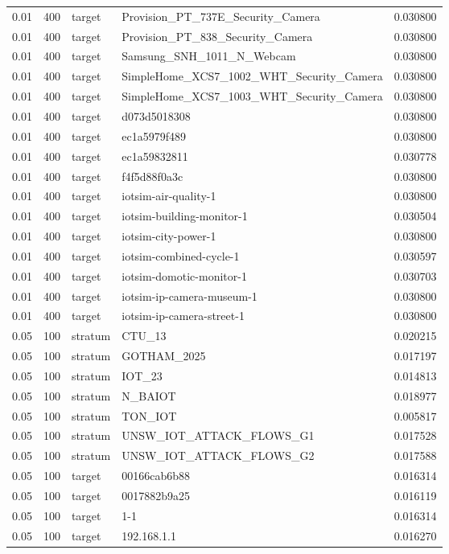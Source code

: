 \begin{tabular}{lllll}
0.01 & 400 & target & Provision\_PT\_737E\_Security\_Camera & 0.030800 \\
0.01 & 400 & target & Provision\_PT\_838\_Security\_Camera & 0.030800 \\
0.01 & 400 & target & Samsung\_SNH\_1011\_N\_Webcam & 0.030800 \\
0.01 & 400 & target & SimpleHome\_XCS7\_1002\_WHT\_Security\_Camera & 0.030800 \\
0.01 & 400 & target & SimpleHome\_XCS7\_1003\_WHT\_Security\_Camera & 0.030800 \\
0.01 & 400 & target & d073d5018308 & 0.030800 \\
0.01 & 400 & target & ec1a5979f489 & 0.030800 \\
0.01 & 400 & target & ec1a59832811 & 0.030778 \\
0.01 & 400 & target & f4f5d88f0a3c & 0.030800 \\
0.01 & 400 & target & iotsim-air-quality-1 & 0.030800 \\
0.01 & 400 & target & iotsim-building-monitor-1 & 0.030504 \\
0.01 & 400 & target & iotsim-city-power-1 & 0.030800 \\
0.01 & 400 & target & iotsim-combined-cycle-1 & 0.030597 \\
0.01 & 400 & target & iotsim-domotic-monitor-1 & 0.030703 \\
0.01 & 400 & target & iotsim-ip-camera-museum-1 & 0.030800 \\
0.01 & 400 & target & iotsim-ip-camera-street-1 & 0.030800 \\
0.05 & 100 & stratum & CTU\_13 & 0.020215 \\
0.05 & 100 & stratum & GOTHAM\_2025 & 0.017197 \\
0.05 & 100 & stratum & IOT\_23 & 0.014813 \\
0.05 & 100 & stratum & N\_BAIOT & 0.018977 \\
0.05 & 100 & stratum & TON\_IOT & 0.005817 \\
0.05 & 100 & stratum & UNSW\_IOT\_ATTACK\_FLOWS\_G1 & 0.017528 \\
0.05 & 100 & stratum & UNSW\_IOT\_ATTACK\_FLOWS\_G2 & 0.017588 \\
0.05 & 100 & target & 00166cab6b88 & 0.016314 \\
0.05 & 100 & target & 0017882b9a25 & 0.016119 \\
0.05 & 100 & target & 1-1 & 0.016314 \\
0.05 & 100 & target & 192.168.1.1 & 0.016270 \\

\end{tabular}
